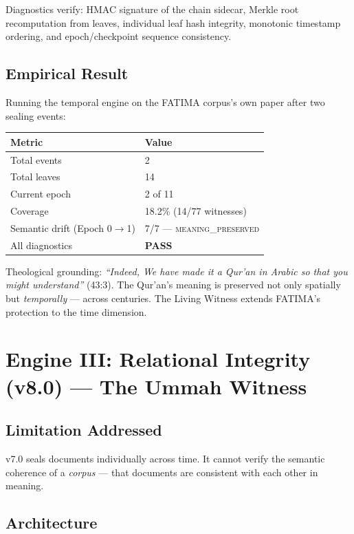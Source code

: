 \documentclass[11pt,a4paper]{article}
\begin{document}
Diagnostics verify: HMAC signature of the chain sidecar, Merkle root recomputation from leaves, individual leaf hash integrity, monotonic timestamp ordering, and epoch/checkpoint sequence consistency.

\subsection{Empirical Result}

Running the temporal engine on the FATIMA corpus's own paper after two sealing events:

\begin{center}
\begin{tabular}{ll}
\toprule
\textbf{Metric} & \textbf{Value} \\
\midrule
Total events & 2 \\
Total leaves & 14 \\
Current epoch & 2 of 11 \\
Coverage & 18.2\% (14/77 witnesses) \\
Semantic drift (Epoch 0$\to$1) & 7/7 --- \textsc{meaning\_preserved} \\
All diagnostics & \textcolor{passgreen}{\textbf{PASS}} \\
\bottomrule
\end{tabular}
\end{center}

Theological grounding: \textit{``Indeed, We have made it a Qur'an in Arabic so that you might understand''} (43:3). The Qur'an's meaning is preserved not only spatially but \textit{temporally} --- across centuries. The Living Witness extends FATIMA's protection to the time dimension.


\section{Engine III: Relational Integrity (v8.0) --- The Ummah Witness}

\subsection{Limitation Addressed}

v7.0 seals documents individually across time. It cannot verify the semantic coherence of a \textit{corpus} --- that documents are consistent with each other in meaning.

\subsection{Architecture}
\end{document}
